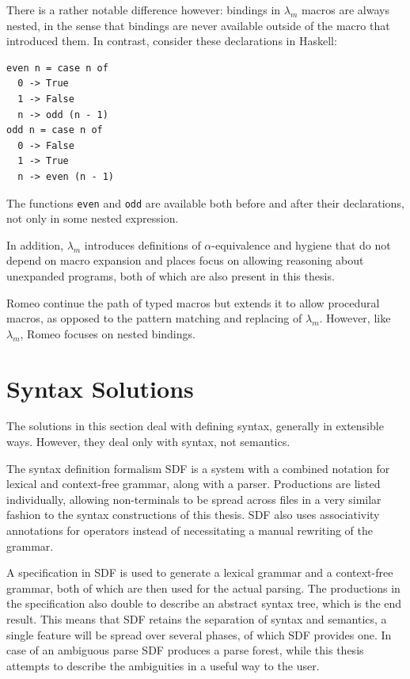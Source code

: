 \documentclass{kththesis}
\begin{document}
There is a rather notable difference however: bindings in $\lambda_m$ macros are always nested, in the sense that bindings are never available outside of the macro that introduced them. In contrast, consider these declarations in Haskell:
\begin{verbatim}
even n = case n of
  0 -> True
  1 -> False
  n -> odd (n - 1)
odd n = case n of
  0 -> False
  1 -> True
  n -> even (n - 1)
\end{verbatim}
The functions \texttt{even} and \texttt{odd} are available both before and after their declarations, not only in some nested expression.

In addition, $\lambda_m$ introduces definitions of $\alpha$-equivalence and hygiene that do not depend on macro expansion and places focus on allowing reasoning about unexpanded programs, both of which are also present in this thesis.

Romeo \cite{Stansifer2014Romeo} continue the path of typed macros but extends it to allow procedural macros, as opposed to the pattern matching and replacing of $\lambda_m$. However, like $\lambda_m$, Romeo focuses on nested bindings.

\section{Syntax Solutions} \label{sec:syntax-solutions}

The solutions in this section deal with defining syntax, generally in extensible ways. However, they deal only with syntax, not semantics.

The syntax definition formalism SDF \cite{Heering1989The-syntax-defi} is a system with a combined notation for lexical and context-free grammar, along with a parser. Productions are listed individually, allowing non-terminals to be spread across files in a very similar fashion to the syntax constructions of this thesis. SDF also uses associativity annotations for operators instead of necessitating a manual rewriting of the grammar.

A specification in SDF is used to generate a lexical grammar and a context-free grammar, both of which are then used for the actual parsing. The productions in the specification also double to describe an abstract syntax tree, which is the end result. This means that SDF retains the separation of syntax and semantics, a single feature will be spread over several phases, of which SDF provides one. In case of an ambiguous parse SDF produces a parse forest, while this thesis attempts to describe the ambiguities in a useful way to the user.
\end{document}
